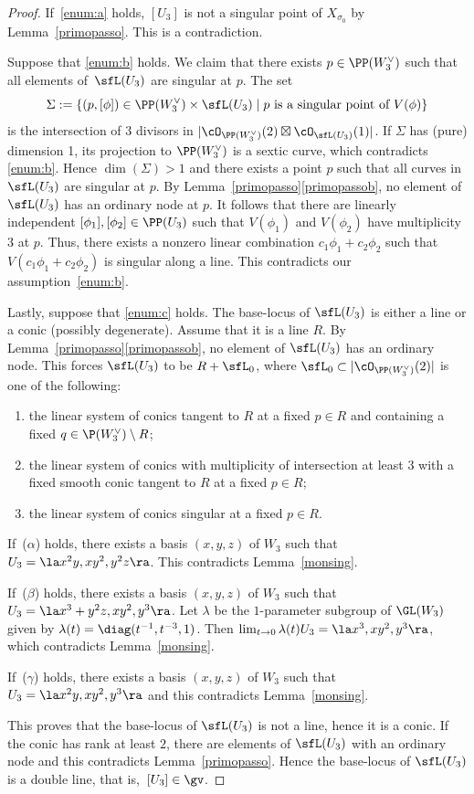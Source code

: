 \begin{proof}
If~\eqref{enum:a} holds, $[U_3]$ is not a singular point of $X_{\sigma_0}$ by Lemma~\ref{primopasso}. This is a contradiction.

Suppose that \eqref{enum:b} holds. We claim that there exists $p\in\PP(W_3^{\vee})$ such that all elements of~$\sfL(U_3)$ are singular at $p$. The set
\[
\Sigma:=\{(p,[\phi])\in \PP(W_3^{\vee})\times\sfL(U_3) \mid \textnormal{$p$ is a singular point of $V(\phi)$}\}
\]
is the intersection of $3$ divisors in $|\cO_{\PP(W_3^{\vee})}(2)\boxtimes\cO_{\sfL(U_3)}(1)|$. If $\Sigma$ has (pure) dimension 1, its projection to $\PP(W_3^{\vee})$ is a sextic curve, which contradicts \eqref{enum:b}. Hence $\dim(\Sigma)>1$ and there exists a point $p$ such that all curves in $\sfL(U_3)$ are singular at $p$. By Lemma~\ref{primopasso}\eqref{primopassob}, no element of $\sfL(U_3)$ has an ordinary node at $p$. It follows that there are linearly independent $[\phi_1],[\phi_2]\in\PP(U_3)$ such that $V(\phi_1)$ and $V(\phi_2)$ have multiplicity $3$ at $p$. Thus, there exists a nonzero linear combination $c_1\phi_1+c_2\phi_2$ such that
$V(c_1\phi_1+c_2\phi_2)$ is singular along a line. This contradicts our assumption~\eqref{enum:b}.

Lastly, suppose that \eqref{enum:c} holds. The base-locus of $\sfL(U_3)$ is either a line or a conic (possibly degenerate). Assume that it is a line $R$.
By Lemma~\ref{primopasso}\eqref{primopassob}, no element of $\sfL(U_3)$ has an ordinary node. This forces $\sfL(U_3)$ to be $R+\sfL_0$, where
$\sfL_0\subset |\cO_{\PP(W_3^{\vee})}(2)|$ is one of the following:
\begin{enumerate}
\item[($\alpha$)]
the linear system of conics tangent to $R$ at a fixed $p\in R$ and containing a fixed
$q\in \P(W_3^{\vee})\setminus R$;
\item[($\beta$)]
the linear system of conics with multiplicity of intersection at least $3$ with a fixed smooth conic tangent to $R$ at a fixed $p\in R$;
\item[($\gamma$)]
the linear system of conics singular at a fixed $p\in R$.
\end{enumerate}
If~($\alpha$) holds, there exists a basis $(x,y,z)$ of $W_3$ such that $U_3=\la x^2y,xy^2,y^2z\ra$. This contradicts
Lemma~\ref{monsing}.

If~($\beta$) holds, there exists a basis $(x,y,z)$ of $W_3$ such that $U_3=\la x^3+y^2z,xy^2,y^3\ra$. Let $\lambda$ be the $1$-parameter subgroup of $\GL(W_3)$ given by $\lambda(t)=\diag(t^{-1},t^{-3},1)$. Then $\lim_{t\to 0}\lambda(t) U_3=\la x^3,xy^2,y^3\ra$, which contradicts
Lemma~\ref{monsing}.

If~($\gamma$) holds, there exists a basis $(x,y,z)$ of $W_3$ such that $U_3=\la x^2y,xy^2,y^3\ra$ and this contradicts Lemma~\ref{monsing}.

This proves that the base-locus of $\sfL(U_3)$ is not a line, hence it is a conic. If the conic has rank at least $2$, there are elements of $\sfL(U_3)$ with an ordinary node and this contradicts Lemma~\ref{primopasso}. Hence the base-locus of $\sfL(U_3)$ is a double line, that is,~$[U_3]\in\gv$.
\end{proof}

